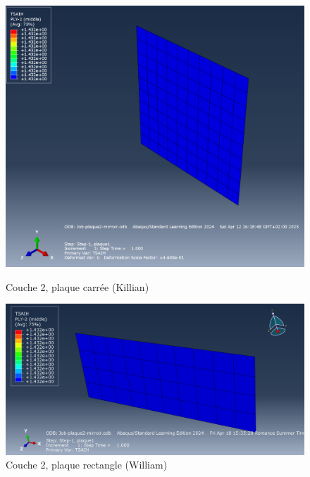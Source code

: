 \documentclass[a4paper,12pt]{article}
\begin{document}
\begin{figure}[H]
	\centering
	\begin{minipage}[t][0.3\textheight]{0.495\textwidth}
		\centering
		\includegraphics[width=\textwidth]{media/K_P2_L2-7_12042025.png} %
		\caption{Couche 2, plaque carrée (Killian)}
		\label{fig:image1}
	\end{minipage}
	\hfill
	\begin{minipage}[t][0.3\textheight]{0.495\textwidth}
		\centering
		\includegraphics[width=\textwidth]{media/Couche2_mirroir.png} %
		\caption{Couche 2, plaque rectangle (William)}
		\label{fig:image2}
	\end{minipage}
\end{figure}
\end{document}
